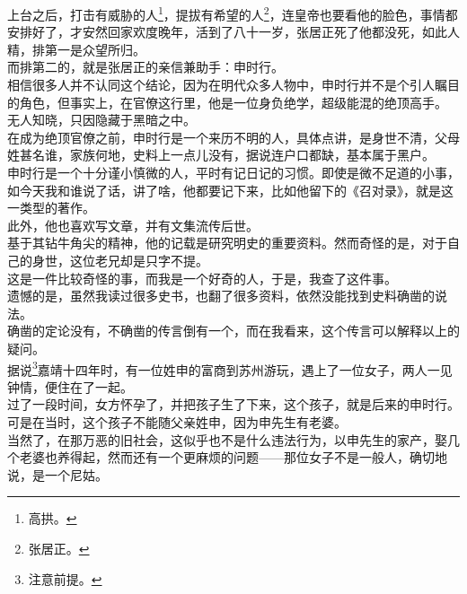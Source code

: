\begin{multicols}{\theparacolNo}
上台之后，打击有威胁的人\footnote{高拱。}，提拔有希望的人\footnote{张居正。}，连皇帝也要看他的脸色，事情都安排好了，才安然回家欢度晚年，活到了八十一岁，张居正死了他都没死，如此人精，排第一是众望所归。\\

而排第二的，就是张居正的亲信兼助手：申时行。\\

相信很多人并不认同这个结论，因为在明代众多人物中，申时行并不是个引人瞩目的角色，但事实上，在官僚这行里，他是一位身负绝学，超级能混的绝顶高手。\\

无人知晓，只因隐藏于黑暗之中。\\

在成为绝顶官僚之前，申时行是一个来历不明的人，具体点讲，是身世不清，父母姓甚名谁，家族何地，史料上一点儿没有，据说连户口都缺，基本属于黑户。\\

申时行是一个十分谨小慎微的人，平时有记日记的习惯。即使是微不足道的小事，如今天我和谁说了话，讲了啥，他都要记下来，比如他留下的《召对录》，就是这一类型的著作。\\

此外，他也喜欢写文章，并有文集流传后世。\\

基于其钻牛角尖的精神，他的记载是研究明史的重要资料。然而奇怪的是，对于自己的身世，这位老兄却是只字不提。\\

这是一件比较奇怪的事，而我是一个好奇的人，于是，我查了这件事。\\

遗憾的是，虽然我读过很多史书，也翻了很多资料，依然没能找到史料确凿的说法。\\

确凿的定论没有，不确凿的传言倒有一个，而在我看来，这个传言可以解释以上的疑问。\\

据说\footnote{注意前提。}嘉靖十四年时，有一位姓申的富商到苏州游玩，遇上了一位女子，两人一见钟情，便住在了一起。\\

过了一段时间，女方怀孕了，并把孩子生了下来，这个孩子，就是后来的申时行。\\

可是在当时，这个孩子不能随父亲姓申，因为申先生有老婆。\\

当然了，在那万恶的旧社会，这似乎也不是什么违法行为，以申先生的家产，娶几个老婆也养得起，然而还有一个更麻烦的问题——那位女子不是一般人，确切地说，是一个尼姑。\\


\end{multicols}
